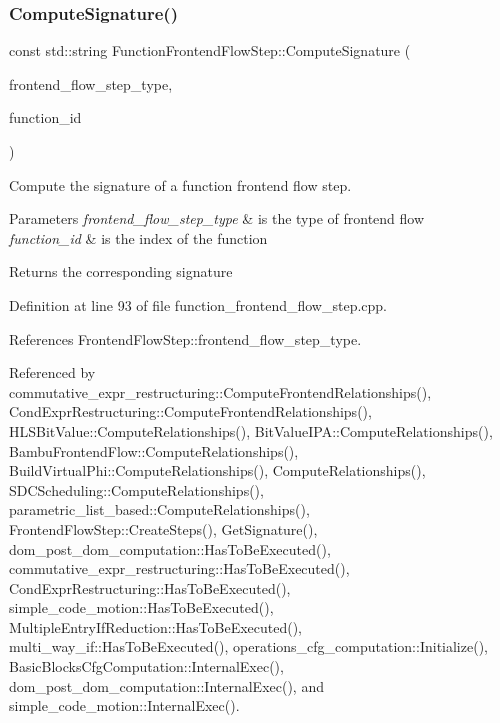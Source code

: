 \subsubsection{\texorpdfstring{Compute\+Signature()}{ComputeSignature()}}
{\footnotesize\ttfamily const std\+::string Function\+Frontend\+Flow\+Step\+::\+Compute\+Signature (\begin{DoxyParamCaption}\item[{const \hyperlink{frontend__flow__step_8hpp_afeb3716c693d2b2e4ed3e6d04c3b63bb}{Frontend\+Flow\+Step\+Type}}]{frontend\+\_\+flow\+\_\+step\+\_\+type,  }\item[{const unsigned int}]{function\+\_\+id }\end{DoxyParamCaption})\hspace{0.3cm}{\ttfamily [static]}}



Compute the signature of a function frontend flow step. 


\begin{DoxyParams}{Parameters}
{\em frontend\+\_\+flow\+\_\+step\+\_\+type} & is the type of frontend flow \\
\hline
{\em function\+\_\+id} & is the index of the function \\
\hline
\end{DoxyParams}
\begin{DoxyReturn}{Returns}
the corresponding signature 
\end{DoxyReturn}


Definition at line 93 of file function\+\_\+frontend\+\_\+flow\+\_\+step.\+cpp.



References Frontend\+Flow\+Step\+::frontend\+\_\+flow\+\_\+step\+\_\+type.



Referenced by commutative\+\_\+expr\+\_\+restructuring\+::\+Compute\+Frontend\+Relationships(), Cond\+Expr\+Restructuring\+::\+Compute\+Frontend\+Relationships(), H\+L\+S\+Bit\+Value\+::\+Compute\+Relationships(), Bit\+Value\+I\+P\+A\+::\+Compute\+Relationships(), Bambu\+Frontend\+Flow\+::\+Compute\+Relationships(), Build\+Virtual\+Phi\+::\+Compute\+Relationships(), Compute\+Relationships(), S\+D\+C\+Scheduling\+::\+Compute\+Relationships(), parametric\+\_\+list\+\_\+based\+::\+Compute\+Relationships(), Frontend\+Flow\+Step\+::\+Create\+Steps(), Get\+Signature(), dom\+\_\+post\+\_\+dom\+\_\+computation\+::\+Has\+To\+Be\+Executed(), commutative\+\_\+expr\+\_\+restructuring\+::\+Has\+To\+Be\+Executed(), Cond\+Expr\+Restructuring\+::\+Has\+To\+Be\+Executed(), simple\+\_\+code\+\_\+motion\+::\+Has\+To\+Be\+Executed(), Multiple\+Entry\+If\+Reduction\+::\+Has\+To\+Be\+Executed(), multi\+\_\+way\+\_\+if\+::\+Has\+To\+Be\+Executed(), operations\+\_\+cfg\+\_\+computation\+::\+Initialize(), Basic\+Blocks\+Cfg\+Computation\+::\+Internal\+Exec(), dom\+\_\+post\+\_\+dom\+\_\+computation\+::\+Internal\+Exec(), and simple\+\_\+code\+\_\+motion\+::\+Internal\+Exec().

